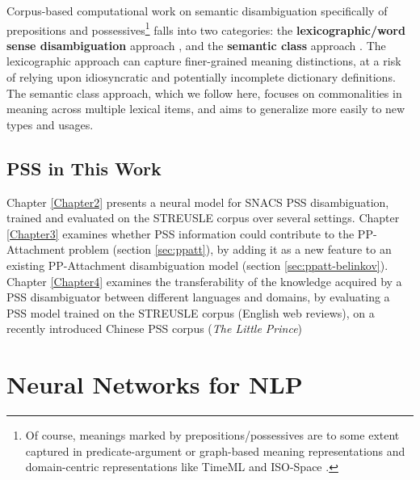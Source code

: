 Corpus-based computational work on semantic disambiguation specifically of prepositions and possessives\footnote{Of course, meanings marked by prepositions\slash possessives are to some extent captured in predicate-argument or graph-based meaning representations \citep[e.g.,][]{palmer-05,framenet,oepen-16,amr} and domain-centric representations like TimeML and \mbox{ISO-Space} \citep{timeml,isospace}.} %
falls into two categories: 
the \textbf{lexicographic\slash word sense disambiguation} approach \citep{litkowski-05,litkowski-07,litkowski-14,ye-07,prepnet,dahlmeier-09,tratz-09,hovy-10,hovy-11,tratz-13},
and the \textbf{semantic class} approach \citep[see also \citealp{muller-12} for German]{moldovan-04,badulescu-09,ohara-09,srikumar-11,srikumar-13,schneider-15,schneider-16,hwang-17}.
The lexicographic approach can capture finer-grained meaning distinctions, at a risk of relying upon idiosyncratic and potentially incomplete dictionary definitions. 
The semantic class approach, which we follow here, focuses on commonalities in meaning across multiple lexical items, and aims to generalize more easily to new types and usages.


\subsection{PSS in This Work}

Chapter \ref{Chapter2} presents a neural model for SNACS PSS disambiguation, trained and evaluated on the STREUSLE corpus over several settings. Chapter \ref{Chapter3} examines whether PSS information could contribute to the PP-Attachment problem (section \ref{sec:ppatt}), by adding it as a new feature to an existing PP-Attachment disambiguation model (section \ref{sec:ppatt-belinkov}). Chapter \ref{Chapter4} examines the transferability of the knowledge acquired by a PSS disambiguator between different languages and domains, by evaluating a PSS model trained on the STREUSLE corpus (English web reviews), on a recently introduced Chinese PSS corpus (\textit{The Little Prince})

\pagebreak

\section{Neural Networks for NLP}

